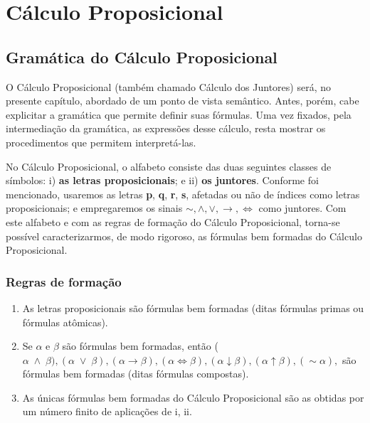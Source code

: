 
\chapter{Cálculo Proposicional}

\section{Gramática do Cálculo Proposicional}

O Cálculo Proposicional (também chamado Cálculo dos Juntores) será, no presente capítulo, abordado de um ponto de vista semântico.
Antes, porém, cabe explicitar a gramática que permite definir suas fórmulas.
Uma vez fixados, pela intermediação da gramática, as expressões desse cálculo, resta mostrar os procedimentos que permitem interpretá-las.

No Cálculo Proposicional, o alfabeto consiste das duas seguintes classes de símbolos: i) \textbf{as letras proposicionais}; e ii) \textbf{os juntores}.
Conforme foi mencionado, usaremos as letras \textbf{p}, \textbf{q}, \textbf{r}, \textbf{s}, afetadas ou não de índices como letras proposicionais; e empregaremos os sinais $\sim, \land, \lor, \to, \iff$ como juntores.
Com este alfabeto e com as regras de formação do Cálculo Proposicional, torna-se possível caracterizarmos, de modo rigoroso, as fórmulas bem formadas do Cálculo Proposicional.

\subsection*{Regras de formação}

\begin{enumerate}[label={\roman*})]
    \item As letras proposicionais são fórmulas bem formadas (ditas fórmulas primas ou fórmulas atômicas).

    \item Se $\alpha$ e $\beta$ são fórmulas bem formadas, então ($\alpha \; \land \; \beta), (\alpha \; \lor \; \beta), (\alpha \to \beta), (\alpha \iff \beta), (\alpha \downarrow \beta), (\alpha \uparrow \beta), (\sim\alpha),$ são fórmulas bem formadas (ditas fórmulas compostas).

    \item As únicas fórmulas bem formadas do Cálculo Proposicional são as obtidas por um número finito de aplicações de i, ii.
\end{enumerate}

